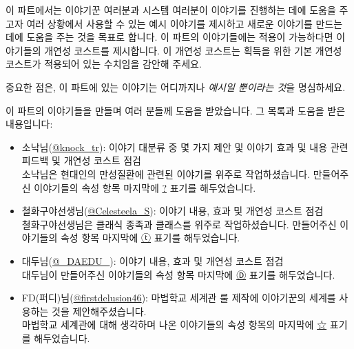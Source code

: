 \documentclass{report}
\begin{document}
	이 파트에서는 이야기꾼 여러분과 시스템 여러분이 이야기를 진행하는 데에 도움을 주고자 여러 상황에서 사용할 수 있는 예시 이야기를 제시하고 새로운 이야기를 만드는 데에 도움을 주는 것을 목표로 합니다. 이 파트의 이야기들에는 적용이 가능하다면 이야기들의 개연성 코스트를 제시합니다. 이 개연성 코스트는 획득을 위한 기본 개연성 코스트가 적용되어 있는 수치임을 감안해 주세요.
	
	중요한 점은, 이 파트에 있는 이야기는 어디까지나 \emph{예시일 뿐이라는 것}을 명심하세요.
	
	이 파트의 이야기들을 만들며 여러 분들께 도움을 받았습니다. 그 목록과 도움을 받은 내용입니다:
	\begin{itemize}
		\item \hypertarget{knock}{}소낙님(\href{https://twitter.com/knock_tr}{@knock\_tr}): 이야기 대분류 중 몇 가지 제안 및 이야기 효과 및 내용 관련 피드백 및 개연성 코스트 점검\\
		소낙님은 현대인의 만성질환에 관련된 이야기를 위주로 작업하셨습니다. 만들어주신 이야기들의 속성 항목 마지막에 \hyperlink{knock}{?} 표기를 해두었습니다.
		
		\item \hypertarget{celesteela}{}철화구야선생님(\href{https://twitter.com/Celesteela_S}{@Celesteela\_S}): 이야기 내용, 효과 및 개연성 코스트 점검\\
		철화구야선생님은 클래식 종족과 클래스를 위주로 작업하셨습니다. 만들어주신 이야기들의 속성 항목 마지막에 \hyperlink{celesteela}{ⓣ} 표기를 해두었습니다.
		
		\item \hypertarget{daedu}{}대두님(\href{https://twitter.com/_DAEDU_}{@\_DAEDU\_}): 이야기 내용, 효과 및 개연성 코스트 점검\\
		대두님이 만들어주신 이야기들의 속성 항목 마지막에 \hyperlink{daedu}{Ⓓ}  표기를 해두었습니다.
		
		\item \hypertarget{fd46}{}FD(퍼디)님(\href{https://twitter.com/firstdelusion46}{@firstdelusion46}): 마법학교 세계관 룰 제작에 이야기꾼의 세계를 사용하는 것을 제안해주셨습니다.\\
		마법학교 세계관에 대해 생각하며 나온 이야기들의 속성 항목의 마지막에 \hyperlink{fd46}{☆} 표기를 해두었습니다.
	\end{itemize}
\end{document}
